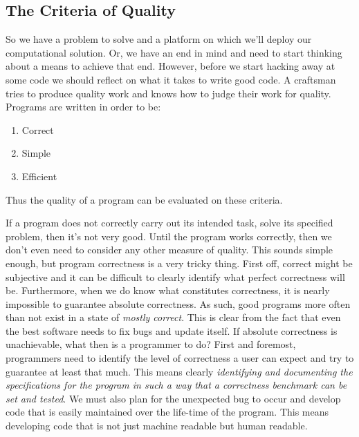 \documentclass[nobib]{tufte-handout}
\begin{document}
\subsection{The Criteria of Quality}

So we have a problem to solve and a platform on which we'll deploy our computational solution. Or, we have an end in mind and need to start thinking about a means to achieve that end.  However, before we start hacking away at some code we should reflect on what it takes to write good code. A craftsman tries to produce quality work and knows how to judge their work for quality. Programs are written in order to be:
\begin{enumerate}
\item Correct
\item Simple
\item Efficient
\end{enumerate}
Thus the quality of a program can be evaluated on these criteria.

If a program does not correctly carry out its intended task, solve its specified problem, then it's not very good. Until the program works correctly, then we don't even need to consider any other measure of quality.  This sounds simple enough, but program correctness is a very tricky thing.  First off, correct might be subjective and it can be difficult to clearly identify what perfect correctness will be.  Furthermore, when we do know what constitutes correctness, it is nearly impossible to guarantee absolute correctness.  As such, good programs more often than not exist in a state of \textit{mostly correct}.  This is clear from the fact that even the best software needs to fix bugs and update itself. If absolute correctness is unachievable, what then is a programmer to do? First and foremost, programmers need to identify the level of correctness a user can expect and try to guarantee at least that much. This means clearly \textit{identifying and documenting the specifications for the program in such a way that a correctness benchmark can be set and \textit{tested}}.  We must also plan for the unexpected bug to occur and develop code that is easily maintained over the life-time of the program.  This means developing code that is not just machine readable but human readable.
\end{document}
